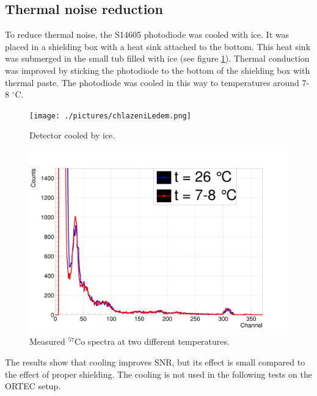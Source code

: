 % 





\subsection{Thermal noise reduction}
To reduce thermal noise, the S14605 photodiode was cooled with ice. It was placed in a shielding box with a heat sink attached to the bottom. This heat sink was submerged in the small tub filled with ice (see figure \ref{cooler}). Thermal conduction was improved by sticking the photodiode to the bottom of the shielding box with thermal paste. The photodiode was cooled in this way to temperatures around 7-8 $^\circ$C.


\begin{figure}[H]
 \centering
 \texttt{[image: ./pictures/chlazeniLedem.png]}
 \caption{Detector cooled by ice.}
 \label{cooler}
 
\end{figure}



\begin{figure}[H]
 \centering
 \includegraphics[scale=0.13, angle = 0]{./pictures/TempDiff.png}
 \caption{Measured $^{57}$Co spectra at two different temperatures.}
 \label{coolspectr}
 
\end{figure}
\par
The results show that cooling improves SNR, but its effect is small compared to the effect of proper shielding. The cooling is not used in the following tests on the ORTEC setup.


